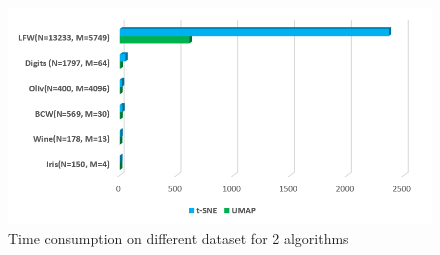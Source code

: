 \begin{figure}[ht]

\centering
\includegraphics[width=12cm,height=7cm\textwidth]{images/image_time_umap_t-SNE.PNG}
\caption{Time consumption on different dataset for 2 algorithms
}
\label{fig:label}
\end{figure}\\

